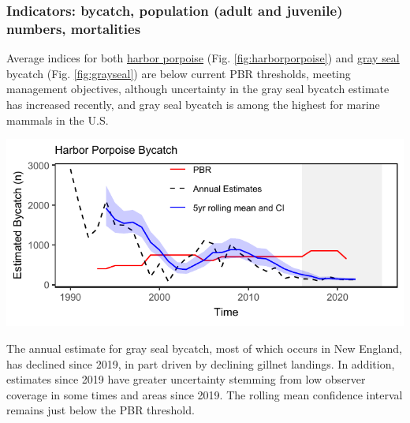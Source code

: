 \documentclass[
  10pt,
]{article}
\let\origfigure\figure
\let\endorigfigure\endfigure
\renewenvironment{figure}[1][2] {
    \expandafter\origfigure\expandafter[H]
} {
    \endorigfigure
}
\begin{document}
\subsubsection{Indicators: bycatch, population (adult and juvenile) numbers, mortalities}\label{indicators-bycatch-population-adult-and-juvenile-numbers-mortalities}

Average indices for both \href{https://noaa-edab.github.io/catalog/harborporpoise.html}{harbor porpoise} (Fig. \ref{fig:harborporpoise}) and \href{https://noaa-edab.github.io/catalog/grayseal.html}{gray seal} bycatch (Fig. \ref{fig:grayseal}) are below current PBR thresholds, meeting management objectives, although uncertainty in the gray seal bycatch estimate has increased recently, and gray seal bycatch is among the highest for marine mammals in the U.S.

\begin{figure}

{\centering \includegraphics{midatlantic_files/figure-latex/harborporpoise-1} 

}

\caption{Harbor porpoise average bycatch estimate for Mid-Atlantic and New England gillnet fisheries (blue) and the potential biological removal (red).}\label{fig:harborporpoise}
\end{figure}

The annual estimate for gray seal bycatch, most of which occurs in New England, has declined since 2019, in part driven by declining gillnet landings. In addition, estimates since 2019 have greater uncertainty stemming from low observer coverage in some times and areas since 2019. The rolling mean confidence interval remains just below the PBR threshold.
\end{document}
